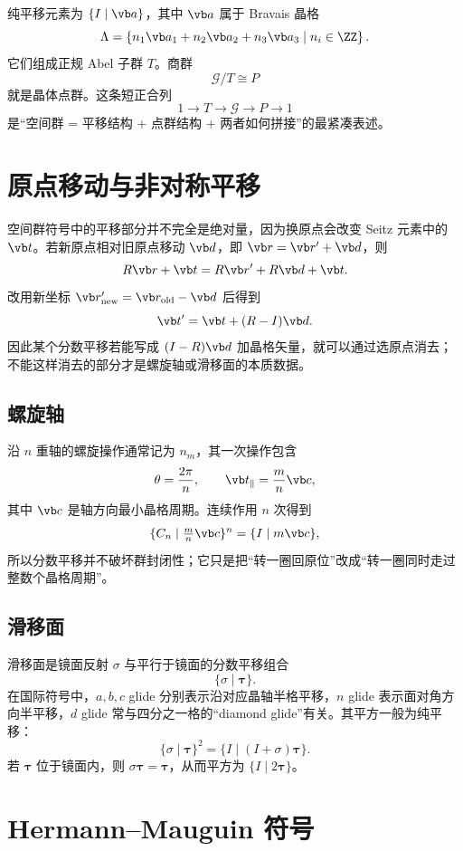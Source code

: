 纯平移元素为 $\{I\mid\vb a\}$，其中 $\vb a$ 属于 Bravais 晶格
\[
\Lambda=\left\{n_1\vb a_1+n_2\vb a_2+n_3\vb a_3\mid n_i\in\ZZ\right\}.
\]
它们组成正规 Abel 子群 $T$。商群
\[
\mathcal G/T\cong P
\]
就是晶体点群。这条短正合列
\[
1\longrightarrow T\longrightarrow\mathcal G
\longrightarrow P\longrightarrow1
\]
是“空间群 = 平移结构 + 点群结构 + 两者如何拼接”的最紧凑表述。

\section{原点移动与非对称平移}

空间群符号中的平移部分并不完全是绝对量，因为换原点会改变 Seitz 元素中的 $\vb t$。若新原点相对旧原点移动 $\vb d$，即 $\vb r=\vb r'+\vb d$，则
\[
R\vb r+\vb t
=R\vb r'+R\vb d+\vb t.
\]
改用新坐标 $\vb r'_{\rm new}=\vb r_{\rm old}-\vb d$ 后得到
\begin{equation}
\vb t' = \vb t+(R-I)\vb d.
\label{eq:origin-shift-seitz-app}
\end{equation}
因此某个分数平移若能写成 $(I-R)\vb d$ 加晶格矢量，就可以通过选原点消去；不能这样消去的部分才是螺旋轴或滑移面的本质数据。

\subsection{螺旋轴}

沿 $n$ 重轴的螺旋操作通常记为 $n_m$，其一次操作包含
\[
\theta=\frac{2\pi}{n},
\qquad
\vb t_{\parallel}=\frac{m}{n}\vb c,
\]
其中 $\vb c$ 是轴方向最小晶格周期。连续作用 $n$ 次得到
\[
\{C_n\mid \tfrac{m}{n}\vb c\}^n
=\{I\mid m\vb c\},
\]
所以分数平移并不破坏群封闭性；它只是把“转一圈回原位”改成“转一圈同时走过整数个晶格周期”。

\subsection{滑移面}

滑移面是镜面反射 $\sigma$ 与平行于镜面的分数平移组合
\[
\{\sigma\mid\boldsymbol\tau\}.
\]
在国际符号中，$a,b,c$ glide 分别表示沿对应晶轴半格平移，$n$ glide 表示面对角方向半平移，$d$ glide 常与四分之一格的“diamond glide”有关。其平方一般为纯平移：
\[
\{\sigma\mid\boldsymbol\tau\}^2
=\{I\mid (I+\sigma)\boldsymbol\tau\}.
\]
若 $\boldsymbol\tau$ 位于镜面内，则 $\sigma\boldsymbol\tau=\boldsymbol\tau$，从而平方为 $\{I\mid2\boldsymbol\tau\}$。

\section{Hermann--Mauguin 符号}

